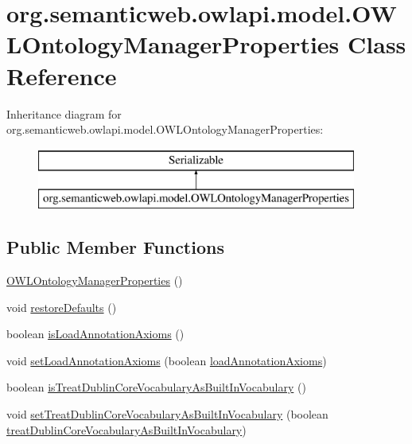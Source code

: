 \hypertarget{classorg_1_1semanticweb_1_1owlapi_1_1model_1_1_o_w_l_ontology_manager_properties}{\section{org.\-semanticweb.\-owlapi.\-model.\-O\-W\-L\-Ontology\-Manager\-Properties Class Reference}
\label{classorg_1_1semanticweb_1_1owlapi_1_1model_1_1_o_w_l_ontology_manager_properties}
}
Inheritance diagram for org.\-semanticweb.\-owlapi.\-model.\-O\-W\-L\-Ontology\-Manager\-Properties\-:\begin{figure}[H]
\begin{center}
\leavevmode
\includegraphics[height=2.000000cm]{classorg_1_1semanticweb_1_1owlapi_1_1model_1_1_o_w_l_ontology_manager_properties}
\end{center}
\end{figure}
\subsection*{Public Member Functions}
\begin{DoxyCompactItemize}
\item 
\hyperlink{classorg_1_1semanticweb_1_1owlapi_1_1model_1_1_o_w_l_ontology_manager_properties_affec4453af8e44a10fa356b1adc9bd29}{O\-W\-L\-Ontology\-Manager\-Properties} ()
\item 
void \hyperlink{classorg_1_1semanticweb_1_1owlapi_1_1model_1_1_o_w_l_ontology_manager_properties_a4674a42ed510e88c964918e8bb3785de}{restore\-Defaults} ()
\item 
boolean \hyperlink{classorg_1_1semanticweb_1_1owlapi_1_1model_1_1_o_w_l_ontology_manager_properties_a241eb64126088ea5f49c9078f9ae5321}{is\-Load\-Annotation\-Axioms} ()
\item 
void \hyperlink{classorg_1_1semanticweb_1_1owlapi_1_1model_1_1_o_w_l_ontology_manager_properties_ad6cae36d443972b147e38cdc608bbcc9}{set\-Load\-Annotation\-Axioms} (boolean \hyperlink{classorg_1_1semanticweb_1_1owlapi_1_1model_1_1_o_w_l_ontology_manager_properties_ab79421cd96e2850d2116db79afcbe938}{load\-Annotation\-Axioms})
\item 
boolean \hyperlink{classorg_1_1semanticweb_1_1owlapi_1_1model_1_1_o_w_l_ontology_manager_properties_aa22529a84cc2eb40184bdf014221808e}{is\-Treat\-Dublin\-Core\-Vocabulary\-As\-Built\-In\-Vocabulary} ()
\item 
void \hyperlink{classorg_1_1semanticweb_1_1owlapi_1_1model_1_1_o_w_l_ontology_manager_properties_a8fc7a3450b21417a1a288d18509f1288}{set\-Treat\-Dublin\-Core\-Vocabulary\-As\-Built\-In\-Vocabulary} (boolean \hyperlink{classorg_1_1semanticweb_1_1owlapi_1_1model_1_1_o_w_l_ontology_manager_properties_acb9009f12a2fad11a2962f1c262f34b6}{treat\-Dublin\-Core\-Vocabulary\-As\-Built\-In\-Vocabulary})
\end{DoxyCompactItemize}
